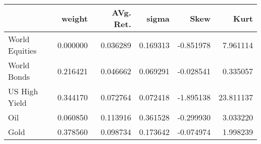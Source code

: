 \begin{tabular}{lrrrrr}
\toprule
{} &    weight &  AVg. Ret. &     sigma &      Skew &       Kurt \\
\midrule
World Equities &  0.000000 &   0.036289 &  0.169313 & -0.851978 &   7.961114 \\
World Bonds    &  0.216421 &   0.046662 &  0.069291 & -0.028541 &   0.335057 \\
US High Yield  &  0.344170 &   0.072764 &  0.072418 & -1.895138 &  23.811137 \\
Oil            &  0.060850 &   0.113916 &  0.361528 & -0.299930 &   3.033220 \\
Gold           &  0.378560 &   0.098734 &  0.173642 & -0.074974 &   1.998239 \\
\bottomrule
\end{tabular}
